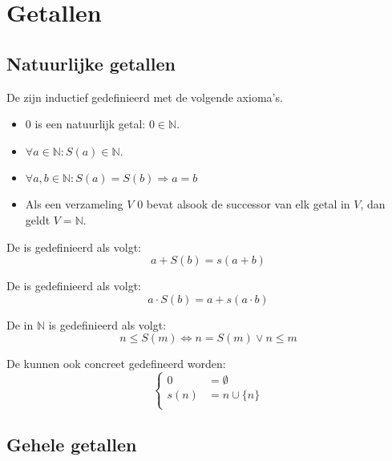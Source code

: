 \documentclass[main.tex]{subfiles}
\begin{document}
\chapter{Getallen}
\label{cha:reele-en-complexe-getallen}

\section{Natuurlijke getallen}
\label{sec:natuurlijke-getallen}

\begin{de}
  De  zijn inductief gedefinieerd met de volgende axioma's.
  \begin{itemize}
  \item $0$ is een natuurlijk getal: $0 \in \mathbb{N}$.
  \item $\forall a \in \mathbb{N}: S(a) \in \mathbb{N}$.
  \item $\forall a,b\in \mathbb{N}: S(a) = S(b) \Rightarrow a=b$
  \item Als een verzameling $V$ $0$ bevat alsook de successor van elk getal in $V$, dan geldt $V=\mathbb{N}$.
  \end{itemize}
\end{de}

\begin{de}
  De  is gedefinieerd als volgt:
  \[ a + S(b) = s(a+b) \]
\end{de}

\begin{de}
  De  is gedefinieerd als volgt:
  \[ a \cdot S(b) = a+ s(a\cdot b) \]
\end{de}

\begin{de}
  De  in $\mathbb{N}$ is gedefinieerd als volgt:
  \[ n \le S(m) \Leftrightarrow n = S(m) \vee n \le m \]
\end{de}

\begin{de}
  De  kunnen ook concreet gedefineerd worden:
  \[
  \left\{
  \begin{array}{rl}
    0 &= \emptyset\\
    s(n) &= n \cup \{ n \}\\
  \end{array}
  \right.
  \]
\end{de}

\section{Gehele getallen}
\label{sec:gehele-getallen}
\end{document}
